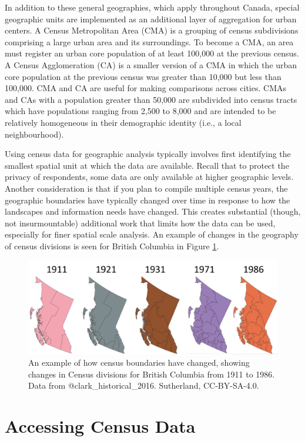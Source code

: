 \documentclass[
]{book}
\begin{document}
In addition to these general geographies, which apply throughout Canada, special geographic units are implemented as an additional layer of aggregation for urban centers. A Census Metropolitan Area (CMA) is a grouping of census subdivisions comprising a large urban area and its surroundings. To become a CMA, an area must register an urban core population of at least 100,000 at the previous census. A Census Agglomeration (CA) is a smaller version of a CMA in which the urban core population at the previous census was greater than 10,000 but less than 100,000. CMA and CA are useful for making comparisons across cities. CMAs and CAs with a population greater than 50,000 are subdivided into census tracts which have populations ranging from 2,500 to 8,000 and are intended to be relatively homogeneous in their demographic identity (i.e., a local neighbourhood).

Using census data for geographic analysis typically involves first identifying the smallest spatial unit at which the data are available. Recall that to protect the privacy of respondents, some data are only available at higher geographic levels. Another consideration is that if you plan to compile multiple census years, the geographic boundaries have typically changed over time in response to how the landscapes and information needs have changed. This creates substantial (though, not insurmountable) additional work that limits how the data can be used, especially for finer spatial scale analysis. An example of changes in the geography of census divisions is seen for British Columbia in Figure \ref{fig:4-shifting-census-boundaries}.

\begin{figure}
\includegraphics[width=0.75\linewidth]{images/04-shifting-census-boundaries} \caption{An example of how census boundaries have changed, showing changes in Census divisions for British Columbia from 1911 to 1986. Data from @clark_historical_2016. Sutherland, CC-BY-SA-4.0.}\label{fig:4-shifting-census-boundaries}
\end{figure}

\section{Accessing Census Data}\label{accessing-census-data}
\end{document}
